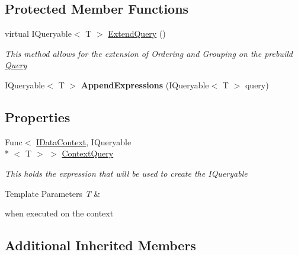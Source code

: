 \subsection*{Protected Member Functions}
\begin{DoxyCompactItemize}
\item 
virtual I\-Queryable$<$ T $>$ \hyperlink{class_highway_1_1_data_1_1_query_objects_1_1_query-g_a4c84387155c4c9eb66ffadec6169fb5c}{Extend\-Query} ()
\begin{DoxyCompactList}\small\item\em This method allows for the extension of Ordering and Grouping on the prebuild \hyperlink{class_highway_1_1_data_1_1_query_objects_1_1_query-g}{Query} \end{DoxyCompactList}\item 
\hypertarget{class_highway_1_1_data_1_1_query_objects_1_1_query-g_ad83e665a02845faedd4fbe821f16f48f}{I\-Queryable$<$ T $>$ {\bfseries Append\-Expressions} (I\-Queryable$<$ T $>$ query)}\label{class_highway_1_1_data_1_1_query_objects_1_1_query-g_ad83e665a02845faedd4fbe821f16f48f}

\end{DoxyCompactItemize}
\subsection*{Properties}
\begin{DoxyCompactItemize}
\item 
Func$<$ \hyperlink{interface_highway_1_1_data_1_1_interfaces_1_1_i_data_context}{I\-Data\-Context}, I\-Queryable\\*
$<$ T $>$ $>$ \hyperlink{class_highway_1_1_data_1_1_query_objects_1_1_query-g_a68ecc8e5735dee1db60782614427cbbf}{Context\-Query}
\begin{DoxyCompactList}\small\item\em This holds the expression that will be used to create the I\-Queryable
\begin{DoxyTemplParams}{Template Parameters}
{\em T} & \\
\hline
\end{DoxyTemplParams}
when executed on the context \end{DoxyCompactList}\end{DoxyCompactItemize}
\subsection*{Additional Inherited Members}


